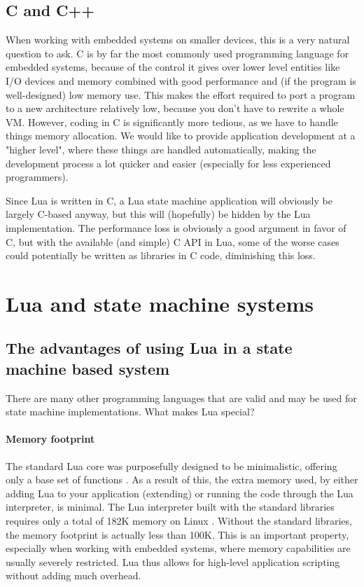 \subsection{C and C++}
\label{sec:lua_vs_c}
When working with embedded systems on smaller devices, this is a very natural question to ask. C is by far the most commonly used programming language for embedded systems, because of the control it gives over lower level entities like I/O devices and memory combined with good performance and (if the program is well-designed) low memory use. This makes the effort required to port a program to a new architecture relatively low, because you don't have to rewrite a whole VM. However, coding in C is significantly more tedious, as we have to handle things memory allocation. We would like to provide application development at a "higher level", where these things are handled automatically, making the development process a lot quicker and easier (especially for less experienced programmers).

Since Lua is written in C, a Lua state machine application will obviously be largely C-based anyway, but this will (hopefully) be hidden by the Lua implementation. The performance loss is obviously a good argument in favor of C, but with the available (and simple) C API in Lua, some of the worse cases could potentially be written as libraries in C code, diminishing this loss.

\section{Lua and state machine systems}
\label{sec:lua_and_state_machines}

\subsection{The advantages of using Lua in a state machine based system}
\label{sec:lua_advantages}

There are many other programming languages that are valid and may be used for state machine implementations. What makes Lua special?

\paragraph{Memory footprint}
The standard Lua core was purposefully designed to be minimalistic, offering only a base set of functions \cite{article:the_implementation_of_lua}. As a result of this, the extra memory used, by either adding Lua to your application (extending) or running the code through the Lua interpreter, is minimal. The Lua interpreter built with the standard libraries requires only a total of 182K memory on Linux \cite{website:lua_about}. Without the standard libraries, the memory footprint is actually less than 100K. This is an important property, especially when working with embedded systems, where memory capabilities are usually severely restricted. Lua thus allows for high-level application scripting without adding much overhead.

